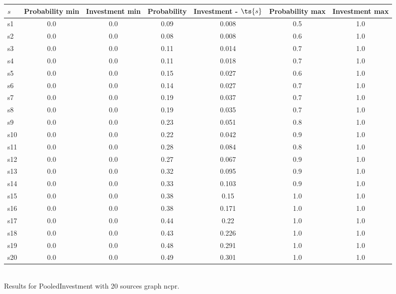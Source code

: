 \documentclass{article}
\begin{document}
\noindent\begin{tabular}{|l|c|c|c|c|c|c|}
\hline
$s$& Probability min & Investment min & Probability & Investment - $\ts{s}$ & Probability max & Investment max\\
\hline
s1 &0.0 & 0.0 & 0.09 & 0.008 & 0.5 & 1.0\\
\hline
s2 &0.0 & 0.0 & 0.08 & 0.008 & 0.6 & 1.0\\
\hline
s3 &0.0 & 0.0 & 0.11 & 0.014 & 0.7 & 1.0\\
\hline
s4 &0.0 & 0.0 & 0.11 & 0.018 & 0.7 & 1.0\\
\hline
s5 &0.0 & 0.0 & 0.15 & 0.027 & 0.6 & 1.0\\
\hline
s6 &0.0 & 0.0 & 0.14 & 0.027 & 0.7 & 1.0\\
\hline
s7 &0.0 & 0.0 & 0.19 & 0.037 & 0.7 & 1.0\\
\hline
s8 &0.0 & 0.0 & 0.19 & 0.035 & 0.7 & 1.0\\
\hline
s9 &0.0 & 0.0 & 0.23 & 0.051 & 0.8 & 1.0\\
\hline
s10 &0.0 & 0.0 & 0.22 & 0.042 & 0.9 & 1.0\\
\hline
s11 &0.0 & 0.0 & 0.28 & 0.084 & 0.8 & 1.0\\
\hline
s12 &0.0 & 0.0 & 0.27 & 0.067 & 0.9 & 1.0\\
\hline
s13 &0.0 & 0.0 & 0.32 & 0.095 & 0.9 & 1.0\\
\hline
s14 &0.0 & 0.0 & 0.33 & 0.103 & 0.9 & 1.0\\
\hline
s15 &0.0 & 0.0 & 0.38 & 0.15 & 1.0 & 1.0\\
\hline
s16 &0.0 & 0.0 & 0.38 & 0.171 & 1.0 & 1.0\\
\hline
s17 &0.0 & 0.0 & 0.44 & 0.22 & 1.0 & 1.0\\
\hline
s18 &0.0 & 0.0 & 0.43 & 0.226 & 1.0 & 1.0\\
\hline
s19 &0.0 & 0.0 & 0.48 & 0.291 & 1.0 & 1.0\\
\hline
s20 &0.0 & 0.0 & 0.49 & 0.301 & 1.0 & 1.0\\
\hline
\end{tabular}\\

\noindent Results for PooledInvestment with 20 sources graph ncpr.
\end{document}
